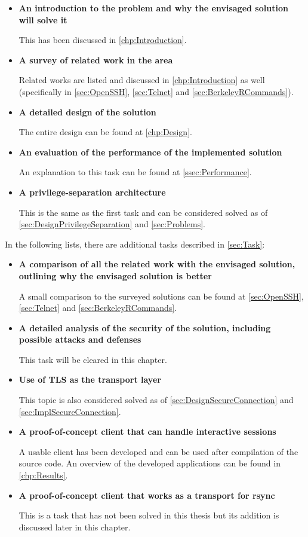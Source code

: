 \documentclass[10pt,a4paper,titlepage,twoside,english,final]{zhawreprt}
\begin{document}
\begin{itemize}
\item \textbf{An introduction to the problem and why the envisaged solution will solve it}

This has been discussed in \ref{chp:Introduction}.

\item \textbf{A survey of related work in the area}

Related works are listed and discussed in \ref{chp:Introduction} as well (specifically in \ref{sec:OpenSSH}, \ref{sec:Telnet} and \ref{sec:BerkeleyRCommands}).

\item \textbf{A detailed design of the solution}

The entire design can be found at \ref{chp:Design}.

\item \textbf{An evaluation of the performance of the implemented solution}

An explanation to this task can be found at \ref{ssec:Performance}.

\item \textbf{A privilege-separation architecture}

This is the same as the first task and can be considered solved as of \ref{sec:DesignPrivilegeSeparation} and \ref{sec:Problems}.
\end{itemize}

In the following lists, there are additional tasks described in \ref{sec:Task}:

\begin{itemize}
\item \textbf{A comparison of all the related work with the envisaged solution, outlining why the envisaged solution is better}

A small comparison to the surveyed solutions can be found at \ref{sec:OpenSSH}, \ref{sec:Telnet} and \ref{sec:BerkeleyRCommands}.

\item \textbf{A detailed analysis of the security of the solution, including
possible attacks and defenses}

This task will be cleared in this chapter.

\item \textbf{Use of TLS as the transport layer}

This topic is also considered solved as of \ref{sec:DesignSecureConnection} and \ref{sec:ImplSecureConnection}.

\item \textbf{A proof-of-concept client that can handle interactive sessions}

A usable client has been developed and can be used after compilation of the source code.
An overview of the developed applications can be found in \ref{chp:Results}.

\item \textbf{A proof-of-concept client that works as a transport for rsync}

This is a task that has not been solved in this thesis but its addition is discussed later in this chapter.
\end{itemize}
\end{document}
